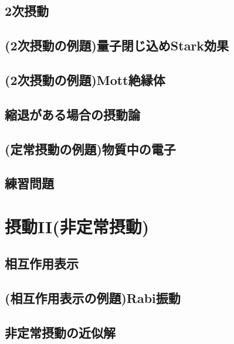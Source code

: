 \documentclass{report}
\begin{document}
      \subsection{2次摂動}
        
      \subsection{(2次摂動の例題)量子閉じ込めStark効果}
        
      \subsection{(2次摂動の例題)Mott絶縁体}
        
      \subsection{縮退がある場合の摂動論}
        
      \subsection{(定常摂動の例題)物質中の電子}
        
      \subsection{練習問題}
        
    \section{摂動II(非定常摂動)}
      
      \subsection{相互作用表示}
        
      \subsection{(相互作用表示の例題)Rabi振動}
        
      \subsection{非定常摂動の近似解}
        
\end{document}
